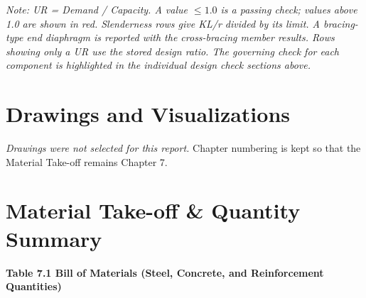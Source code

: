 \documentclass[12pt,a4paper]{report}
\numberwithin{table}{chapter}
\numberwithin{figure}{chapter}
\renewcommand{\arraystretch}{1.12}
\newcommand{\ReportSectionStyle}{\small\setlength{\tabcolsep}{3pt}\renewcommand{\arraystretch}{1.15}}
\begin{document}
\noindent\textit{Note: UR = Demand / Capacity. A value $\leq 1.0$ is a passing check; values above 1.0 are shown in red. Slenderness rows give KL/r divided by its limit. A bracing-type end diaphragm is reported with the cross-bracing member results. Rows showing only a UR use the stored design ratio. The governing check for each component is highlighted in the individual design check sections above.}


\ReportSectionStyle
\chapter{Drawings and Visualizations}
\label{chap:drawings}
\noindent\textit{Drawings were not selected for this report.} Chapter numbering is kept so that the Material Take-off remains Chapter 7.

\setcounter{chapter}{6}
\ReportSectionStyle

\chapter{Material Take-off \& Quantity Summary}
\label{ch:material-takeoff}

\noindent\textbf{Table 7.1  Bill of Materials (Steel, Concrete, and Reinforcement Quantities)}
\end{document}
